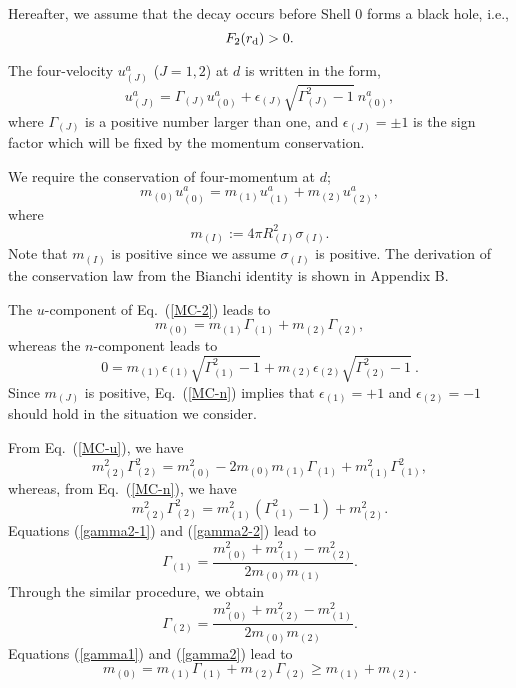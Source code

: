 \documentclass[aps,preprint,preprintnumber,nofootinbib,amsmath,amssymb,ascmac,bm,12pt]{revtex4}
\newcommand{\rd}{r_{\rm d}}
\newcommand{\mz}{m_{(0)}}
\newcommand{\mo}{m_{(1)}}
\newcommand{\mt}{m_{(2)}}
\newcommand{\Go}{\varGamma_{(1)}}
\newcommand{\Gt}{\varGamma_{(2)}}
\begin{document}
Hereafter, we assume that the decay occurs before Shell 0 forms a black hole, i.e., 
\begin{equation}
F_2(\rd)>0. \label{rd-cons}
\end{equation}

The four-velocity $u_{(J)}^a$ ($J=1,2$) at $d$ is written in the form, 
\begin{equation}
u_{(J)}^a=\varGamma_{(J)} u_{(0)}^a+\epsilon_{(J)}\sqrt{\varGamma_{(J)}^2-1} ~n_{(0)}^a, \label{uj-comp}
\end{equation}
where $\varGamma_{(J)}$ is a positive number larger than one, and 
$\epsilon_{(J)}=\pm1$ is the sign factor which will be fixed by the momentum conservation. 

We require the conservation of four-momentum at $d$; 
\begin{equation}
\mz u_{(0)}^a=\mo u_{(1)}^a+\mt u_{(2)}^a, \label{MC-2}
\end{equation} 
where 
$$
m_{(I)}:=4\pi R_{(I)}^2 \sigma_{(I)}. 
$$
Note that $m_{(I)}$ is positive since we assume $\sigma_{(I)}$ is positive.  
The derivation of the conservation law from the Bianchi identity is shown in Appendix B. 

The $u$-component of Eq.~(\ref{MC-2}) leads to
\begin{equation}
\mz=\mo \varGamma_{(1)}+\mt\varGamma_{(2)}, \label{MC-u}
\end{equation}
whereas the $n$-component leads to
\begin{equation}
0=\mo\epsilon_{(1)}\sqrt{\varGamma_{(1)}^2-1}+\mt\epsilon_{(2)}\sqrt{\varGamma_{(2)}^2-1}~. \label{MC-n}
\end{equation}
Since $m_{(J)}$ is positive, Eq.~(\ref{MC-n}) implies that $\epsilon_{(1)}=+1$ and $\epsilon_{(2)}=-1$ should hold 
in the situation we consider. 

From Eq.~(\ref{MC-u}), we have
\begin{equation}
\mt^2\Gt^2=\mz^2-2\mz\mo\Go+\mo^2\Go^2, \label{gamma2-1}
\end{equation}
whereas, from Eq.~(\ref{MC-n}), we have
\begin{equation}
\mt^2\Gt^2=\mo^2\left(\Go^2-1\right)+\mt^2. \label{gamma2-2}
\end{equation}
Equations (\ref{gamma2-1}) and (\ref{gamma2-2}) lead to 
\begin{equation}
\Go=\frac{\mz^2+\mo^2-\mt^2}{2\mz\mo}. \label{gamma1}
\end{equation}
Through the similar procedure, we obtain
\begin{equation}
\Gt=\frac{\mz^2+\mt^2-\mo^2}{2\mz\mt}. \label{gamma2}
\end{equation}
Equations (\ref{gamma1}) and (\ref{gamma2}) lead to
\begin{equation}
\mz=\mo\Go+\mt\Gt \geq \mo+\mt. \label{mass-order}
\end{equation}
\end{document}
